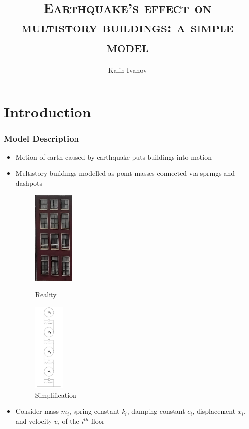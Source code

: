 \documentclass[xcolor=svgnames,9pt]{beamer}
\title[EQ's effect on multistory buildings]
{\textsc{Earthquake's effect on multistory buildings: a simple model}}
\institute[]{\large \textsc{\v{C}VUT FSv}}
\author[Kalin Ivanov]
{Kalin Ivanov}
\date[15 June 2017]
{Mathematics 2 Semester Project
\\
\bigskip
15 June 2017\\
\bigskip
\bigskip
\bigskip
\small supervised by Ing. Michal Bene\v{s}, Ph.D\par
}
\theoremstyle{remark}
\begin{document}
		\begin{frame}
  			\titlepage
		\end{frame}
	\section{Introduction}
		\begin{frame}
			\frametitle{Model Description}
			\begin{itemize}
				\item Motion of earth caused by earthquake puts buildings into motion
				\item Multistory buildings modelled as point-masses connected via springs and dashpots

				\begin{figure}
 				 	\begin{minipage}[b]{0.4\textwidth}
						\centering
    						\includegraphics[width=20mm]{bldg.png}
    						\caption{Reality}
						\label{bldg}
  					\end{minipage}
 					 \hfill
					\begin{minipage}[b]{0.4\textwidth}
						\centering
 				  	 	\includegraphics[width=15mm]{SPRINGS-Model1A.jpg}
    						\caption{Simplification}
						\label{Springs1}
 					 \end{minipage}
				\end{figure}

				\item Consider mass $m_i$, spring constant $k_i$, damping constant $c_i$, displacement $x_i$,  and velocity $v_i$ of the $i^{th}$ floor
			\end{itemize}
			\bigskip
		\end{frame}
\end{document}
